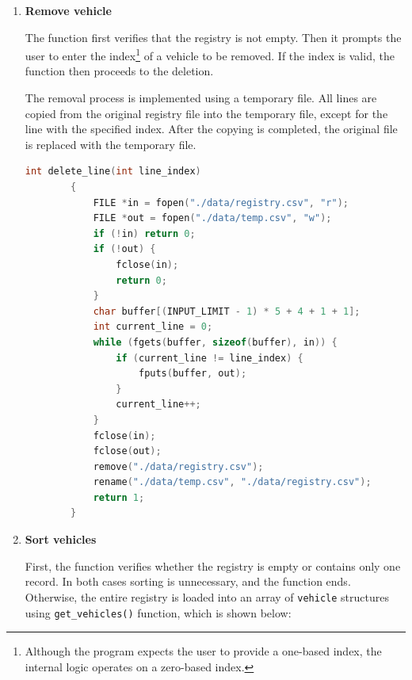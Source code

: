 \documentclass[12pt, a4paper]{article}
\begin{document}
\begin{enumerate}
\begin{lstlisting}[language=C, caption={Writing to the registry}]
        fprintf(file, "%s,%s,%s,%s,%d\n", trim(v.type), trim(v.brand), ...);
        fclose(file);
        return 1;
    }
    \end{lstlisting}

  Each value is trimmed to remove leading and trailing whitespace before being stored to the registry. The above example shortens the \texttt{fprintf()} statement for readability.

  \item \textbf{Remove vehicle}

  The function first verifies that the registry is not empty. Then it prompts the user to enter the index\footnote{Although the program expects the user to provide a one-based index, the internal logic operates on a zero-based index.} of a vehicle to be removed. If the index is valid, the function then proceeds to the deletion.

   The removal process is implemented using a temporary file. All lines are copied from the original registry file into the temporary file, except for the line with the specified index. After the copying is completed, the original file is replaced with the temporary file.
\clearpage
        \begin{lstlisting}[language=C, caption={Deleting a line in the registry}]
        int delete_line(int line_index)
        {
            FILE *in = fopen("./data/registry.csv", "r");
            FILE *out = fopen("./data/temp.csv", "w");
            if (!in) return 0;
            if (!out) {
                fclose(in);
                return 0;
            }
            char buffer[(INPUT_LIMIT - 1) * 5 + 4 + 1 + 1];
            int current_line = 0;
            while (fgets(buffer, sizeof(buffer), in)) {
                if (current_line != line_index) {
                    fputs(buffer, out);
                }
                current_line++;
            }
            fclose(in);
            fclose(out);
            remove("./data/registry.csv");
            rename("./data/temp.csv", "./data/registry.csv");
            return 1;
        }
    \end{lstlisting}

  \item \textbf{Sort vehicles}

    First, the function verifies whether the registry is empty or contains only one record. In both cases sorting is unnecessary, and the function ends. Otherwise, the entire registry is loaded into an array of \texttt{vehicle} structures using \texttt{get\_vehicles()} function, which is shown below:
        \clearpage
    

\end{enumerate}
\end{document}
